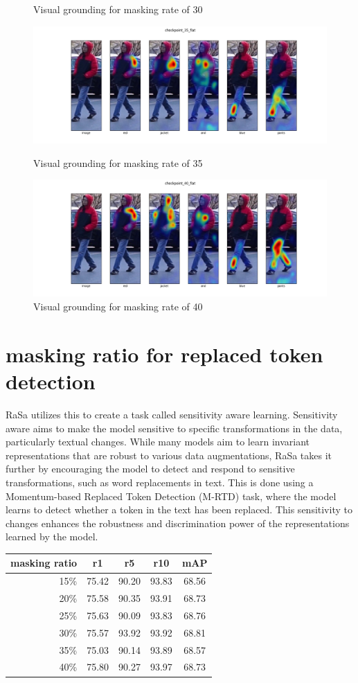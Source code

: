 \begin{figure}
  \caption{Visual grounding for masking rate of 30}
  \includegraphics[options]{img/mrtd_masking_ratio/mrtd-checkpoint_35_flat.png}
  \caption{Visual grounding for masking rate of 35}
  \includegraphics[options]{img/mrtd_masking_ratio/mrtd-checkpoint_40_flat.png}
  \caption{Visual grounding for masking rate of 40}
\end{figure}

\section{masking ratio for replaced token detection}
RaSa utilizes this to create a task called sensitivity aware learning.
Sensitivity aware aims to make the model sensitive to specific transformations in the data, particularly textual changes. While many models aim to learn invariant representations that are robust to various data augmentations, RaSa takes it further by encouraging the model to detect and respond to sensitive transformations, such as word replacements in text. This is done using a Momentum-based Replaced Token Detection (M-RTD) task, where the model learns to detect whether a token in the text has been replaced. This sensitivity to changes enhances the robustness and discrimination power of the representations learned by the model.

\begin{tabular}{rcccc}
  masking ratio & r1 & r5 & r10 & mAP \\ \hline
  15\% & 75.42 & 90.20 & 93.83 & 68.56 \\
  20\% & 75.58 & 90.35 & 93.91 & 68.73 \\
  25\% & 75.63 & 90.09 & 93.83 & 68.76 \\
  30\% & 75.57 & 93.92 & 93.92 & 68.81 \\
  35\% & 75.03 & 90.14 & 93.89 & 68.57 \\
  40\% & 75.80 & 90.27 & 93.97 & 68.73
\end{tabular}

